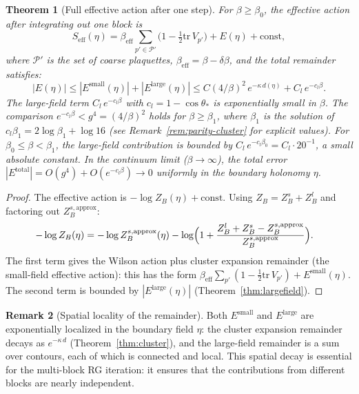 \documentclass[11pt]{article}
\newtheorem{theorem}{Theorem}[section]
\theoremstyle{definition}
\newtheorem{remark}[theorem]{Remark}
\newcommand{\tr}{\mathrm{tr}}
\begin{document}
\begin{theorem}[Full effective action after one step]\label{thm:fulleff}
For $\beta\ge\beta_0$, the effective action after integrating out one block
is
\begin{equation}\label{eq:Seff-full}
S_{\mathrm{eff}}(\eta)
=\beta_{\mathrm{eff}}\sum_{p'\in\mathcal{P}'}
\bigl(1-\tfrac{1}{2}\tr\,V_{p'}\bigr)
+E(\eta)+\mathrm{const},
\end{equation}
where $\mathcal{P}'$ is the set of coarse plaquettes,
$\beta_{\mathrm{eff}}=\beta-\delta\beta$, and the total remainder
satisfies:
\begin{equation}\label{eq:E-total}
|E(\eta)|\le|E^{\mathrm{small}}(\eta)|+|E^{\mathrm{large}}(\eta)|
\le C(4/\beta)^2\,e^{-\kappa\,d(\eta)}+C_l\,e^{-c_l\beta}.
\end{equation}
The large-field term $C_l\,e^{-c_l\beta}$ with
$c_l=1-\cos\theta_*$ is exponentially small in $\beta$.
The comparison $e^{-c_l\beta}<g^4=(4/\beta)^2$ holds for
$\beta\ge\beta_1$, where $\beta_1$ is the solution of
$c_l\beta_1=2\log\beta_1+\log 16$
(see Remark~\ref{rem:parity-cluster} for explicit values).
For $\beta_0\le\beta<\beta_1$,
the large-field contribution is bounded by
$C_l\,e^{-c_l\beta_0}=C_l\cdot 20^{-1}$, a small absolute constant.
In the continuum limit ($\beta\to\infty$), the total error
$|E^{\mathrm{total}}|=O(g^4)+O(e^{-c_l\beta})\to 0$
uniformly in the boundary holonomy $\eta$.
\end{theorem}

\begin{proof}
The effective action is $-\log Z_B(\eta)+\mathrm{const}$.  Using
$Z_B=Z_B^s+Z_B^l$ and factoring out $Z_B^{s,\mathrm{approx}}$:
\begin{align}
-\log Z_B(\eta)
&=-\log Z_B^{s,\mathrm{approx}}(\eta)
-\log\Bigl(1+\frac{Z_B^l+Z_B^s-Z_B^{s,\mathrm{approx}}}
{Z_B^{s,\mathrm{approx}}}\Bigr).
\end{align}
The first term gives the Wilson action plus cluster expansion remainder
(the small-field effective action): this has the form
$\beta_{\mathrm{eff}}\sum_{p'}(1-\frac{1}{2}\tr\,V_{p'})
+E^{\mathrm{small}}(\eta)$.
The second term is bounded by $|E^{\mathrm{large}}(\eta)|$
(Theorem~\ref{thm:largefield}).
\end{proof}

\begin{remark}[Spatial locality of the remainder]
Both $E^{\mathrm{small}}$ and $E^{\mathrm{large}}$ are exponentially
localized in the boundary field $\eta$: the cluster expansion
remainder decays as $e^{-\kappa\,d}$ (Theorem~\ref{thm:cluster}), and
the large-field remainder is a sum over contours, each of which is
connected and local.  This spatial decay is essential for the
multi-block RG iteration: it ensures that the contributions from
different blocks are nearly independent.
\end{remark}
\end{document}
